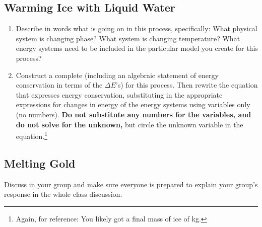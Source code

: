 \subsection{Warming Ice with Liquid Water}  

\begin{fnt}
	
\end{fnt}


\begin{enumerate}
	\item Describe in words what is going on in this process, specifically: What physical system is changing phase? What system is changing temperature? What energy systems need to be included in the particular model you create for this process?
	
	\item Construct a complete \EnergyDiagram{} (including an algebraic statement of energy conservation in terms of the $\Delta E$'s) for this process. Then rewrite the equation that expresses energy conservation, substituting in the appropriate expressions for changes in energy of the energy systems using variables only (no numbers). \textbf{Do not substitute any numbers for the variables, and do not solve for the unknown,} but circle the unknown variable in the equation.\footnote{Again, for reference: You likely got a final mass of ice of \about\unit[5]{kg}.}

\WCD

\end{enumerate}

\subsection{Melting Gold}

\begin{fnt}
	
\end{fnt}


\noindent Discuss in your group and make sure everyone is prepared to explain your group's response in the whole class discussion.

\WCD
